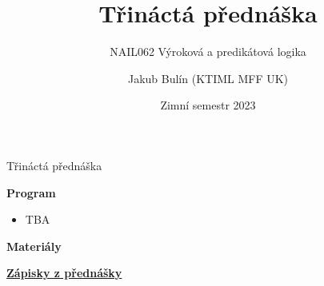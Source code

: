 \documentclass{beamer}
\title{Třináctá přednáška}
\subtitle{NAIL062 Výroková a predikátová logika}
\author{Jakub Bulín (KTIML MFF UK)}
\date{Zimní semestr 2023}
\begin{document}
\frame{\titlepage}


\begin{frame}{Třináctá přednáška}

    \textbf{Program}
        \begin{itemize}
            \item TBA
        \end{itemize}        
    

    \textbf{Materiály}

        \href{https://github.com/jbulin-mff-uk/nail062/raw/main/lecture/lecture-notes/lecture-notes.pdf}{\alert{\textbf{Zápisky z přednášky}}}%

\end{frame}
\end{document}

